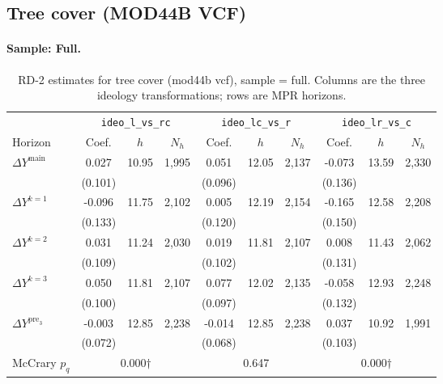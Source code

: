 \documentclass[11pt]{article}
\begin{document}
\clearpage
\subsection{Tree cover (MOD44B VCF)}
\paragraph{Sample: Full.}
\begin{table}[H]
\centering
\scriptsize
\caption{RD-2 estimates for tree cover (mod44b vcf), sample = full.
Columns are the three ideology transformations; rows are MPR horizons.}
\label{tab:rd2_tree_cover_all}
\begin{tabular}{l ccc ccc ccc}
\toprule
 & \multicolumn{3}{c}{\texttt{ideo\_l\_vs\_rc}}
 & \multicolumn{3}{c}{\texttt{ideo\_lc\_vs\_r}}
 & \multicolumn{3}{c}{\texttt{ideo\_lr\_vs\_c}} \\
\cmidrule(lr){2-4} \cmidrule(lr){5-7} \cmidrule(lr){8-10}
Horizon & Coef. & $h$ & $N_h$ & Coef. & $h$ & $N_h$ & Coef. & $h$ & $N_h$ \\
\midrule
$\Delta Y^{\text{main}}$ & 0.027 & 10.95 & 1,995 & 0.051 & 12.05 & 2,137 & -0.073 & 13.59 & 2,330 \\
 & (0.101) &  &  & (0.096) &  &  & (0.136) &  &  \\
\addlinespace[1pt]
$\Delta Y^{k=1}$ & -0.096 & 11.75 & 2,102 & 0.005 & 12.19 & 2,154 & -0.165 & 12.58 & 2,208 \\
 & (0.133) &  &  & (0.120) &  &  & (0.150) &  &  \\
\addlinespace[1pt]
$\Delta Y^{k=2}$ & 0.031 & 11.24 & 2,030 & 0.019 & 11.81 & 2,107 & 0.008 & 11.43 & 2,062 \\
 & (0.109) &  &  & (0.102) &  &  & (0.131) &  &  \\
\addlinespace[1pt]
$\Delta Y^{k=3}$ & 0.050 & 11.81 & 2,107 & 0.077 & 12.02 & 2,135 & -0.058 & 12.93 & 2,248 \\
 & (0.100) &  &  & (0.097) &  &  & (0.132) &  &  \\
\addlinespace[1pt]
$\Delta Y^{\text{pre}_3}$ & -0.003 & 12.85 & 2,238 & -0.014 & 12.85 & 2,238 & 0.037 & 10.92 & 1,991 \\
 & (0.072) &  &  & (0.068) &  &  & (0.103) &  &  \\
\addlinespace[1pt]
\midrule
McCrary $p_q$ & \multicolumn{3}{c}{0.000$\dagger$} & \multicolumn{3}{c}{0.647} & \multicolumn{3}{c}{0.000$\dagger$} \\
\bottomrule
\end{tabular}
\end{table}
\end{document}
